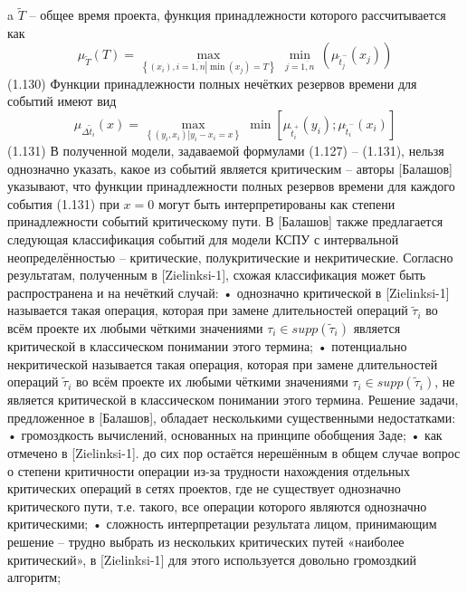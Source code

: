 a $\tilde T$ – общее время проекта, функция принадлежности которого рассчитывается как
	\[{{\mu }_{{\tilde{T}}}}\left( T \right)=\underset{\left\{ \left( {{x}_{i}} \right),i=\overline{1,n}\left| \min \left( {{x}_{j}} \right)=T \right. \right\}}{\mathop{\max }}\,\underset{j=\overline{1,n}}{\mathop{\min }}\,\left( {{\mu }_{\tilde{t}_{j}^{-}}}\left( {{x}_{j}} \right) \right)\] 	(1.130)
Функции принадлежности полных нечётких резервов времени для событий имеют вид
	\[{{\mu }_{\Delta {{{\tilde{t}}}_{i}}}}\left( x \right)=\underset{\left\{ \left( {{y}_{i}},{{x}_{i}} \right)\left| {{y}_{i}}-{{x}_{i}}=x \right. \right\}}{\mathop{\max }}\,\min \left[ {{\mu }_{\tilde{t}_{i}^{+}}}\left( {{y}_{i}} \right);{{\mu }_{\tilde{t}_{i}^{-}}}\left( {{x}_{i}} \right) \right]\] 	(1.131)
В полученной модели, задаваемой формулами (1.127) – (1.131), нельзя однозначно указать, какое из событий является критическим – авторы [Балашов] указывают, что функции принадлежности полных резервов времени для каждого события (1.131) при $x=0$ могут быть интерпретированы как степени принадлежности событий критическому пути. В [Балашов] также предлагается следующая классификация событий для модели КСПУ с интервальной неопределённостью – критические, полукритические и некритические. Согласно результатам, полученным в [Zielinksi-1], схожая классификация может быть распространена и на нечёткий случай:
•	однозначно критической в [Zielinksi-1] называется такая операция, которая при замене длительностей операций $\tilde \tau_i$ во всём проекте их любыми чёткими значениями ${{\tau }_{i}}\in supp\left( {{{\tilde{\tau }}}_{i}} \right)$ является критической в классическом понимании этого термина;
•	потенциально некритической называется такая операция, которая при замене длительностей операций $\tilde \tau_i$ во всём проекте их любыми чёткими значениями ${{\tau }_{i}}\in supp\left( {{{\tilde{\tau }}}_{i}} \right)$, не является критической в классическом понимании этого термина.
Решение задачи, предложенное в [Балашов], обладает несколькими существенными недостатками:
•	громоздкость вычислений, основанных на принципе обобщения Заде;
•	как отмечено в [Zielinksi-1]. до сих пор остаётся нерешённым в общем случае вопрос о степени критичности операции из-за трудности нахождения отдельных критических операций в сетях проектов, где не существует однозначно критического пути, т.е. такого, все операции которого являются однозначно критическими;
•	сложность интерпретации результата лицом, принимающим решение – трудно выбрать из нескольких критических путей «наиболее критический», в [Zielinksi-1] для этого используется довольно громоздкий алгоритм;
